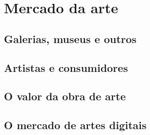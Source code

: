 \section{Mercado da arte}
\label{sec:mercado de arte}

\subsection{Galerias, museus e outros}
\label{subsec: galerias, museus e outros}

\subsection{Artistas e consumidores}
\label{subsec: artistas e consumidores}

\subsection{O valor da obra de arte}
\label{subsec: o valor das obras}

\subsection{O mercado de artes digitais}
\label{subsec: o mercado digital}
















